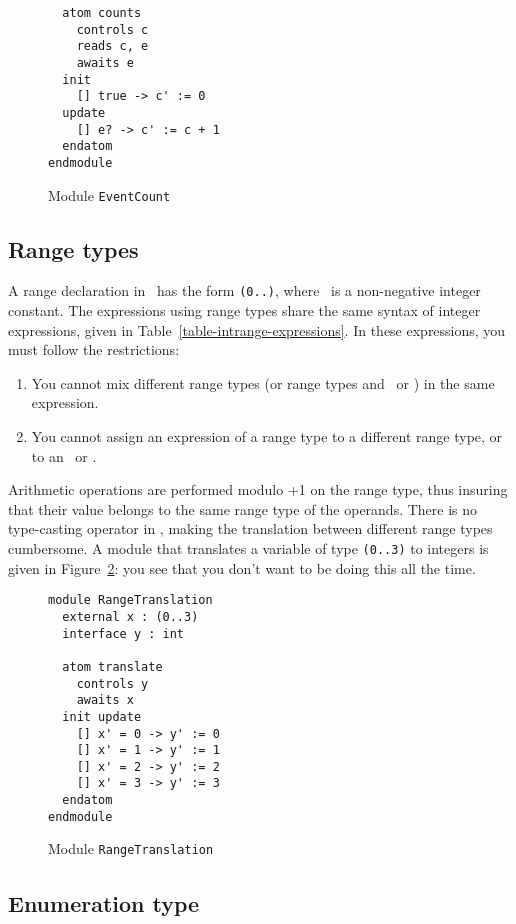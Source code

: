 {\begin{figure}
\begin{verbatim}
  atom counts
    controls c
    reads c, e
    awaits e
  init
    [] true -> c' := 0
  update
    [] e? -> c' := c + 1
  endatom
endmodule
\end{verbatim}
\caption{Module {\tt EventCount}}
\label{fig-eventcount}
\end{figure}


\subsection{Range types}

A range declaration in \mocha\ has the form {\tt (0..\maxrange)},
where \maxrange\ is a non-negative integer constant.  The expressions
using range types share the same syntax of integer expressions, given
in Table~\ref{table-intrange-expressions}.  In these expressions, you
must follow the restrictions:
%
\begin{enumerate}

\item You cannot mix different range types (or range types and \INT\
or \NAT) in the same expression.

\item You cannot assign an expression of a range type to a different
range type, or to an \INT\ or \NAT.

\end{enumerate}
%
Arithmetic operations are performed modulo \maxrange+1 on the range
type, thus insuring that their value belongs to the same range type of
the operands.  There is no type-casting operator in \mocha, making the
translation between different range types cumbersome.  A module that
translates a variable of type {\tt (0..3)} to integers is given in
Figure~\ref{fig-rangetranslation}: you see that you don't want to be
doing this all the time.

\begin{figure}
\begin{verbatim}
module RangeTranslation
  external x : (0..3)
  interface y : int

  atom translate
    controls y
    awaits x
  init update
    [] x' = 0 -> y' := 0
    [] x' = 1 -> y' := 1
    [] x' = 2 -> y' := 2
    [] x' = 3 -> y' := 3
  endatom
endmodule
\end{verbatim}
\caption{Module {\tt RangeTranslation}}
\label{fig-rangetranslation}
\end{figure}

\subsection{Enumeration type}
\label{sec-enum}

}
